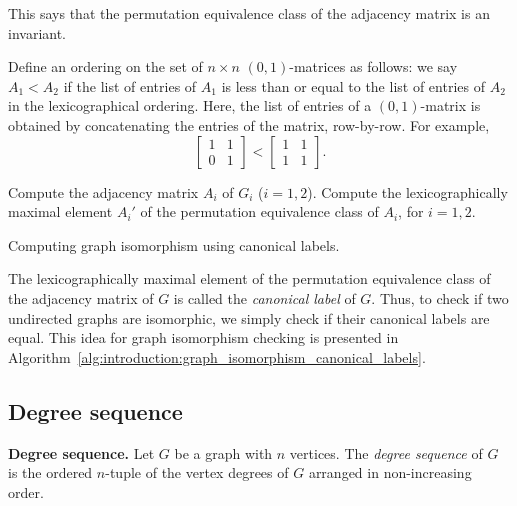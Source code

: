 This says that the permutation equivalence class of the adjacency
matrix is an invariant.

Define an ordering on the set of $n \times n$ $(0, 1)$-matrices as
follows: we say $A_1 < A_2$ if the list of entries of $A_1$ is less
than or equal to the list of entries of $A_2$ in the lexicographical
ordering. Here, the list of entries of a $(0, 1)$-matrix is obtained
by concatenating the entries of the matrix, row-by-row. For example,
\[
\begin{bmatrix}
1 & 1 \\
0 & 1
\end{bmatrix}
<
\begin{bmatrix}
1 & 1 \\
1 & 1
\end{bmatrix}.
\]

\begin{algorithm}[!htpb]
\SetLine
\dontprintsemicolon  %
\BlankLine
Compute the adjacency matrix $A_i$ of $G_i$ ($i = 1, 2$).\;
Compute the lexicographically maximal element $A_i'$ of the
permutation equivalence class of $A_i$, for $i = 1, 2$.\;
\caption{Computing graph isomorphism using canonical labels.}
\label{alg:introduction:graph_isomorphism_canonical_labels}
\end{algorithm}

The lexicographically maximal element of the permutation equivalence
class of the adjacency matrix of $G$ is called the
\emph{canonical label} of $G$. Thus, to check if two undirected graphs
are isomorphic, we simply check if their canonical labels are equal.
 This idea for graph isomorphism checking
is presented in
Algorithm~\ref{alg:introduction:graph_isomorphism_canonical_labels}.



\subsection{Degree sequence}

\begin{definition}
\textbf{Degree sequence.}
Let $G$ be a graph with $n$ vertices. The \emph{degree sequence} of
$G$ is the ordered $n$-tuple of the vertex degrees of $G$ arranged in
non-increasing order.
\end{definition}

